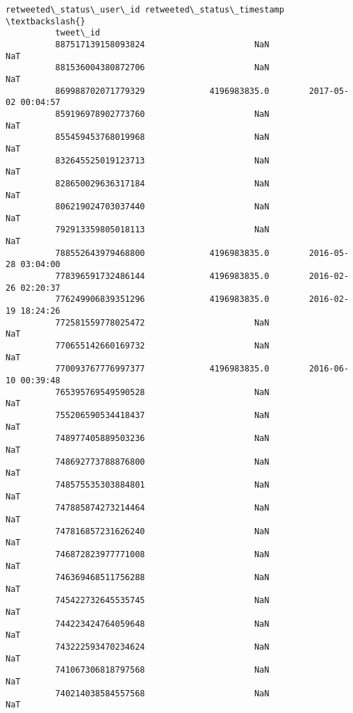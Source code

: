 \documentclass[11pt]{article}
\begin{document}
\begin{Verbatim}[commandchars=\\\{\}]
                             retweeted\_status\_user\_id retweeted\_status\_timestamp  \textbackslash{}
          tweet\_id                                                                 
          887517139158093824                      NaN                        NaT   
          881536004380872706                      NaN                        NaT   
          869988702071779329             4196983835.0        2017-05-02 00:04:57   
          859196978902773760                      NaN                        NaT   
          855459453768019968                      NaN                        NaT   
          832645525019123713                      NaN                        NaT   
          828650029636317184                      NaN                        NaT   
          806219024703037440                      NaN                        NaT   
          792913359805018113                      NaN                        NaT   
          788552643979468800             4196983835.0        2016-05-28 03:04:00   
          778396591732486144             4196983835.0        2016-02-26 02:20:37   
          776249906839351296             4196983835.0        2016-02-19 18:24:26   
          772581559778025472                      NaN                        NaT   
          770655142660169732                      NaN                        NaT   
          770093767776997377             4196983835.0        2016-06-10 00:39:48   
          765395769549590528                      NaN                        NaT   
          755206590534418437                      NaN                        NaT   
          748977405889503236                      NaN                        NaT   
          748692773788876800                      NaN                        NaT   
          748575535303884801                      NaN                        NaT   
          747885874273214464                      NaN                        NaT   
          747816857231626240                      NaN                        NaT   
          746872823977771008                      NaN                        NaT   
          746369468511756288                      NaN                        NaT   
          745422732645535745                      NaN                        NaT   
          744223424764059648                      NaN                        NaT   
          743222593470234624                      NaN                        NaT   
          741067306818797568                      NaN                        NaT   
          740214038584557568                      NaN                        NaT   

\end{Verbatim}
\end{document}
